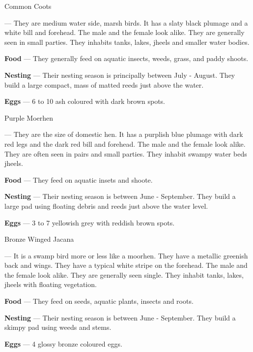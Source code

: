 \begin{bird}{Common Coots}

 --- They are medium water side, marsh birds. It has a slaty black plumage and a white bill and forehead. The male and the female look alike. They are generally seen in small parties. They inhabits tanks, lakes, jheels and smaller water bodies. 

{\large\bf Food} --- They generally feed on aquatic insects, weeds, grass, and paddy shoots. 

{\large\bf Nesting} --- Their nesting season is principally between July - August. They build a large compact, mass of matted reeds just above the water.

{\bf Eggs} --- 6 to 10 ash coloured with dark brown spots.
\end{bird}

\begin{bird}{Purple Moerhen}

 --- They are the size of domestic hen. It has a purplish blue plumage with dark red legs and the dark red bill and forehead. The male and the female look alike. They are often seen in pairs and small parties. They inhabit swampy water beds jheels.

{\large\bf Food} --- They feed on aquatic insets and shoote. 

{\large\bf Nesting} --- Their nesting season is between June - September. They build a large pad using floating debris and reeds just above the water level. 

{\large\bf Eggs} --- 3 to 7 yellowish grey with reddish brown spots.
\end{bird}

\newpage

\begin{bird}{Bronze Winged Jacana}

 --- It is a swamp bird more or less like a moorhen. They have a metallic greenish back and wings. They have a typical white stripe on the forehead. The male and the female look alike. They are generally seen single. They inhabit tanks, lakes, jheels with floating vegetation. 

{\large\bf Food} --- They feed on seeds, aquatic plants, insects and roots.

{\large\bf Nesting} --- Their nesting season is between June - September. They build a skimpy pad using weeds and stems.

{\large\bf Eggs} --- 4 glossy bronze coloured eggs.
\end{bird}



